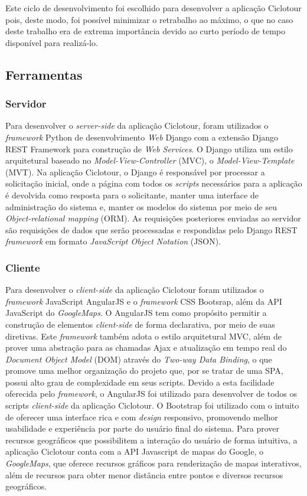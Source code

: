 Este ciclo de desenvolvimento foi escolhido para desenvolver a aplicação Ciclotour pois, deste modo, foi possível minimizar o retrabalho ao 
máximo, o que no caso deste trabalho era de extrema importância devido ao curto período de tempo disponível para realizá-lo. 

\subsection{Ferramentas}

\subsubsection{Servidor}
Para desenvolver o \textit{server-side} da aplicação Ciclotour, foram utilizados o \textit{framework} Python de desenvolvimento \textit{Web} Django com a 
extensão Django REST Framework para construção de \textit{\textit{Web} Services}. O Django utiliza um estilo arquitetural baseado no 
\textit{Model-View-Controller} (MVC), o \textit{Model-View-Template} (MVT). Na aplicação Ciclotour, o Django é responsável por processar a 
solicitação inicial, onde a página com todos os \textit{scripts} necessários para a aplicação é devolvida como resposta para o solicitante,
manter uma interface de administração do sistema e, manter os modelos do sistema por meio de seu \textit{Object-relational mapping} (ORM). 
As requisições posteriores enviadas ao servidor são requisições de dados que serão processadas e respondidas pelo Django REST \textit{framework} 
em formato \textit{JavaScript Object Notation} (JSON).

\subsubsection{Cliente}
Para desenvolver o \textit{client-side} da aplicação Ciclotour foram utilizados o \textit{framework} JavaScript AngularJS e o \textit{framework} 
CSS Bootsrap, além da API JavaScript do \textit{GoogleMaps}. 
O AngularJS tem como propósito permitir a construção de elementos \textit{client-side} de forma 
declarativa, por meio de suas diretivas. 
Este \textit{framework} também adota o estilo arquitetural MVC, além de prover uma abstração para as chamadas
Ajax e atualização em tempo real do \textit{Document Object Model} (DOM) através do \textit{Two-way Data Binding}, o que promove uma melhor 
organização do projeto que, por se tratar de uma SPA, possui alto grau de complexidade em seus scripts. Devido a esta facilidade oferecida pelo 
\textit{framework}, o AngularJS foi utilizado para desenvolver de todos os scripts \textit{client-side} da aplicação Ciclotour. 
O Bootstrap foi utilizado 
com o intuito de oferecer uma interface rica e com \textit{design} responsivo, promovendo melhor usabilidade e experiência por parte do usuário 
final do sistema. Para prover recursos geográficos que possibilitem a interação do usuário de forma intuitiva, a aplicação Ciclotour conta com a API 
Javascript de mapas do Google, o \textit{GoogleMaps}, que oferece recursos gráficos para 
renderização de mapas interativos, além de recursos para obter menor 
distância entre pontos e diversos recursos geográficos.

